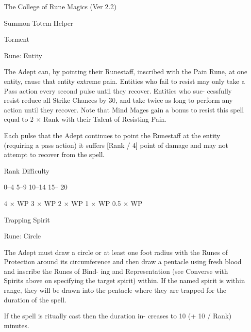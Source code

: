 \begin{Chapter}{The College of Rune Magics (Ver 2.2)}
\begin{spell}[S-13]{Summon Totem Helper }
\begin{effects}
\end{effects}
\end{spell}

\begin{spell}[S-14]{Torment }

Rune: Entity 
\begin{effects}
 The  Adept  can,  by  pointing 
their 
Runestaff,  inscribed  with  the  Pain  Rune,  at  one 
entity, cause that entity extreme pain. Entities who 
fail  to  resist  may  only  take  a  Pass  action  every 
second  pulse  until  they  recover.  Entities  who  suc-
cessfully  resist  reduce  all  Strike  Chances  by  30, 
and take  twice  as  long  to perform any  action until 
they  recover.  Note  that  Mind  Mages  gain  a  bonus 
to  resist  this  spell  equal  to  2  ×  Rank  with  their 
Talent of Resisting Pain. 

Each  pulse  that  the  Adept  continues  to  point  the 
Runestaff  at  the  entity  (requiring  a  pass  action)  it 
suffers  [Rank  /  4]  point  of  damage  and  may  not 
attempt to recover from the spell. 

Rank  Difficulty 

0–4 
5–9 
10–14 
15– 
20 

4 × WP 
3 × WP 
2 × WP 
1 × WP 
0.5 × WP 

\end{effects}
\end{spell}

\begin{spell}[S-15]{Trapping Spirit }

Rune: Circle 
\begin{effects}
 The  Adept  must  draw  a  circle  or  at  least 
one  foot  radius  with  the  Runes  of  Protection 
around its circumference and then draw a pentacle 
using  fresh  blood  and  inscribe  the  Runes  of  Bind-
ing  and  Representation  (see  Converse  with  Spirits 
above on specifying the target spirit) within. If the 
named  spirit  is  within  range,  they  will  be  drawn 
into  the  pentacle  where  they  are  trapped  for  the 
duration of the spell. 

If  the  spell  is  ritually  cast  then  the  duration  in-
creases to 10 (+ 10 / Rank) minutes. 



\end{effects}
\end{spell}
\end{Chapter}
